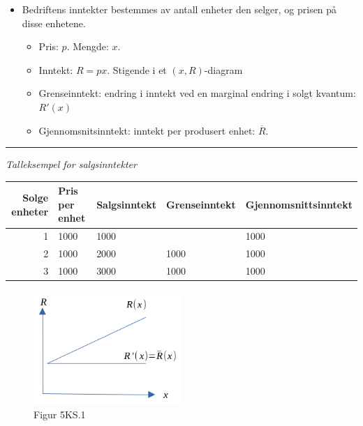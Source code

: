 \documentclass[
  letterpaper,
  DIV=11,
  numbers=noendperiod]{scrartcl}
\providecommand{\tightlist}{%
  \setlength{\itemsep}{0pt}\setlength{\parskip}{0pt}}\usepackage{longtable,booktabs,array}
\begin{document}
\begin{itemize}
\tightlist
\item
  Bedriftens inntekter bestemmes av antall enheter den selger, og prisen
  på disse enhetene.

  \begin{itemize}
  \tightlist
  \item
    Pris: \(p\). Mengde: \(x\).
  \item
    Inntekt: \(R=px\). Stigende i et \((x,R)\)-diagram
  \item
    Grenseinntekt: endring i inntekt ved en marginal endring i solgt
    kvantum: \(R'(x)\)
  \item
    Gjennomsnitsinntekt: inntekt per produsert enhet: \(\overline{R}\).
  \end{itemize}
\end{itemize}

\begin{center}\rule{0.5\linewidth}{0.5pt}\end{center}

\emph{Talleksempel for salgsinntekter}

\begin{tabular}[t]{r|l|l|l|l}
\hline
Solge enheter & Pris per enhet & Salgsinntekt & Grenseinntekt & Gjennomsnittsinntekt\\
\hline
1 & 1000 & 1000 &  & 1000\\
\hline
2 & 1000 & 2000 & 1000 & 1000\\
\hline
3 & 1000 & 3000 & 1000 & 1000\\
\hline
\end{tabular}

\begin{figure}[H]

{\centering \includegraphics[width=0.5\textwidth,height=\textheight]{drawio/inntf.png}

}

\caption{Figur 5KS.1}

\end{figure}%
\end{document}
